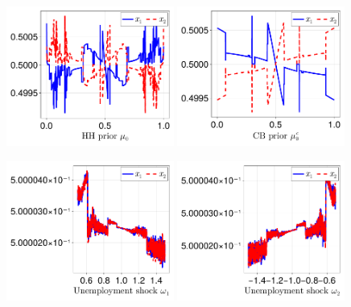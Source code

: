\documentclass[12pt,a4paper]{article}
\begin{document}
\begin{figure}[H]
\centering
\includegraphics[width=0.49\textwidth]{figures/V9/γ=1.0-μ_0=0.5-α=0.0/fig_optimal_x_by_μ_0.pdf}
\includegraphics[width=0.49\textwidth]{figures/V9/γ=1.0-μ_0=0.5-α=0.0/fig_optimal_x_by_μ_0_c.pdf}
\end{figure}

\begin{figure}[H]
\centering
\includegraphics[width=0.49\textwidth]{figures/V9/γ=1.0-μ_0=0.5-α=0.0/fig_optimal_x_by_ω_1.pdf}
\includegraphics[width=0.49\textwidth]{figures/V9/γ=1.0-μ_0=0.5-α=0.0/fig_optimal_x_by_ω_2.pdf}
\end{figure}
\end{document}
